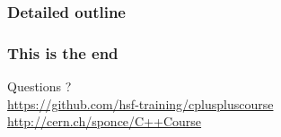 \documentclass[compress]{beamer}
\begin{document}
\begin{frame}
  \frametitle{Detailed outline}
  \begin{scriptsize}
    \begin{multicols}{3}
      \tableofcontents[sectionstyle=show,subsectionstyle=show]
    \end{multicols}
  \end{scriptsize}
\end{frame}











\begin{frame}
  \frametitle{This is the end}
  \begin{center}
    \Huge Questions ?\\
    \vspace{.5cm}
    \tiny \href{https://github.com/hsf-training/cpluspluscourse}{https://github.com/hsf-training/cpluspluscourse}\\
    \tiny \href{http://cern.ch/sponce/C++Course}{http://cern.ch/sponce/C++Course}
  \end{center}
\end{frame}
\end{document}
